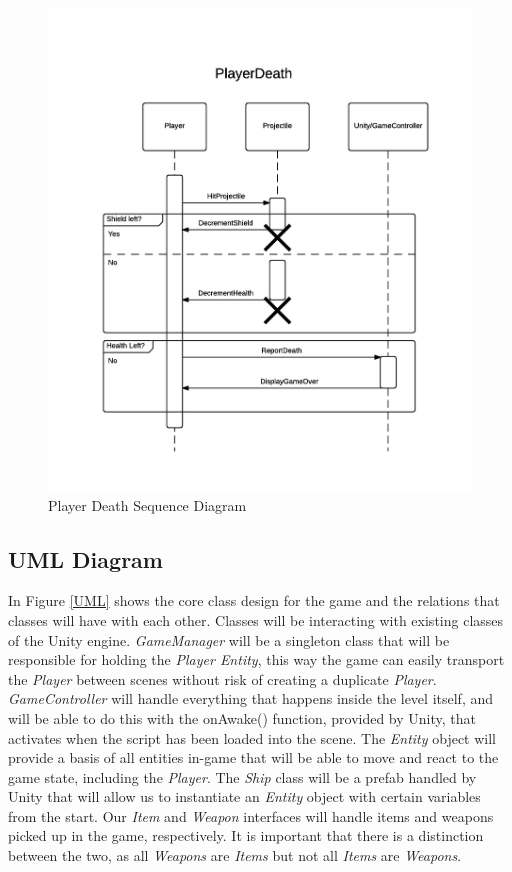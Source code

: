 \documentclass[12pt]{article}       %
\def\hs{\hspace{15pt}}
\begin{document}
\begin{figure} [H]
\centering
\includegraphics[width=4.75in]{PlayerDeath.png}
\caption{Player Death Sequence Diagram} \label{PlayerDeath}
\end{figure}

\subsection{UML Diagram}
\hs In Figure \ref{UML} shows the core class design for the game and the relations that classes will have with each other. Classes will be interacting with existing classes of the Unity engine. {\it GameManager} will be a singleton class that will be responsible for holding the {\it Player Entity}, this way the game can easily transport the {\it Player} between scenes without risk of creating a duplicate {\it Player}. {\it GameController} will handle everything that happens inside the level itself, and will be able to do this with the onAwake() function, provided by Unity, that activates when the script has been loaded into the scene. The {\it Entity} object will provide a basis of all entities in-game that will be able to move and react to the game state, including the {\it Player}. The {\it Ship} class will be a prefab handled by Unity that will allow us to instantiate an {\it Entity} object with certain variables from the start. Our {\it Item} and {\it Weapon} interfaces will handle items and weapons picked up in the game, respectively. It is important that there is a distinction between the two, as all {\it Weapons} are {\it Items} but not all {\it Items} are {\it Weapons}.
\end{document}
